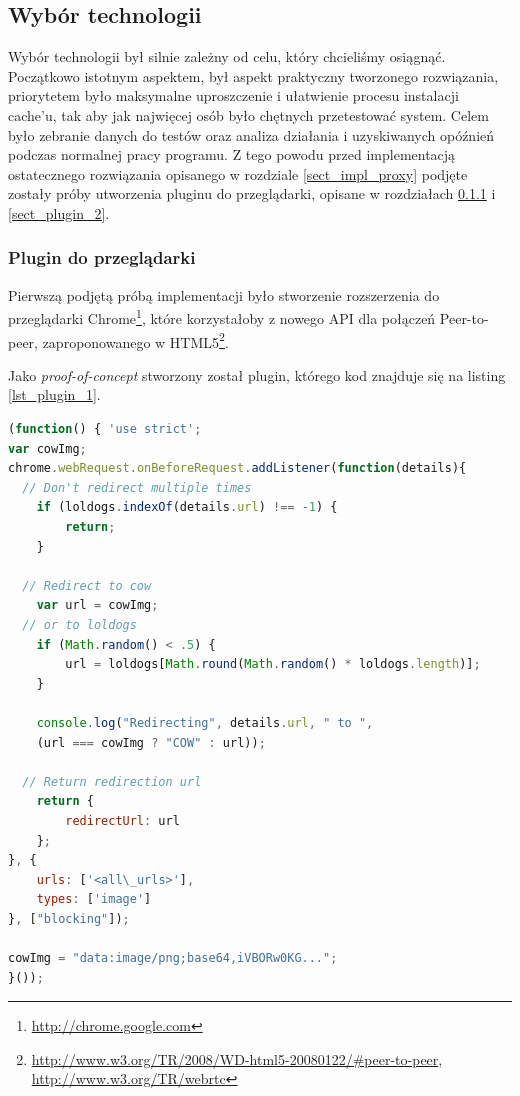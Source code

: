 \documentclass[a4paper,11pt]{scrartcl}
\newcommand{\keszu}{cache'u}
\begin{document}
\subsection{Wybór technologii}
\label{sect_impl_technology}
Wybór technologii był silnie zależny od celu, który chcieliśmy osiągnąć. Początkowo istotnym aspektem, był aspekt praktyczny tworzonego rozwiązania, priorytetem było maksymalne uproszczenie i ułatwienie procesu instalacji \keszu, tak aby jak najwięcej osób było chętnych przetestować system. Celem było zebranie danych do testów oraz analiza działania i uzyskiwanych opóźnień podczas normalnej pracy programu. Z tego powodu przed implementacją ostatecznego rozwiązania opisanego w rozdziale \ref{sect_impl_proxy} podjęte zostały próby utworzenia pluginu do przeglądarki, opisane w rozdziałach \ref{sect_plugin_1} i \ref{sect_plugin_2}.

\subsubsection{Plugin do przeglądarki}
\label{sect_plugin_1}
Pierwszą podjętą próbą implementacji było stworzenie rozszerzenia do przeglądarki Chrome\footnote{\url{http://chrome.google.com}}, które korzystałoby z nowego API dla połączeń Peer-to-peer, zaproponowanego w HTML5\footnote{\url{http://www.w3.org/TR/2008/WD-html5-20080122/#peer-to-peer}, \url{http://www.w3.org/TR/webrtc}}.

Jako \textit{proof-of-concept} stworzony został plugin, którego kod znajduje się na listing \ref{lst_plugin_1}.

\begin{lstlisting}[language={JavaScript}, label={lst_plugin_1}, 
  caption={Kod rozszerzenia dla przeglądarki Chrome, realizujący \textit{proof-of-concept}.}]
(function() { 'use strict';
var cowImg;
chrome.webRequest.onBeforeRequest.addListener(function(details){
  // Don't redirect multiple times
	if (loldogs.indexOf(details.url) !== -1) {
		return;
	}
	
  // Redirect to cow
	var url = cowImg;
  // or to loldogs
	if (Math.random() < .5) {
		url = loldogs[Math.round(Math.random() * loldogs.length)];
	}
	
	console.log("Redirecting", details.url, " to ", 
    (url === cowImg ? "COW" : url));
    
  // Return redirection url
	return {
		redirectUrl: url
	};
}, {
	urls: ['<all\_urls>'],
	types: ['image']
}, ["blocking"]);

cowImg = "data:image/png;base64,iVBORw0KG...";
}());
\end{lstlisting}
\end{document}
